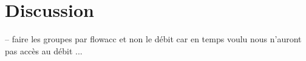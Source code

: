 \section{Discussion}


-- faire les groupes par flowacc et non le débit car en temps voulu nous n'auront pas accès au débit ... 